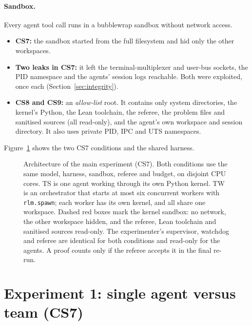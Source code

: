 \documentclass[11pt]{article}
\begin{document}
\paragraph{Sandbox.} Every agent tool call runs in a bubblewrap sandbox without network access.
\begin{itemize}
  \item \textbf{CS7:} the sandbox started from the full filesystem and hid only the other workspaces.
  \item \textbf{Two leaks in CS7:} it left the terminal-multiplexer and user-bus sockets, the PID namespace and the
    agents' session logs reachable. Both were exploited, once each (Section~\ref{sec:integrity}).
  \item \textbf{CS8 and CS9:} an \emph{allow-list} root. It contains only system directories, the kernel's Python, the
    Lean toolchain, the referee, the problem files and sanitised sources (all read-only), and the agent's own workspace
    and session directory. It also uses private PID, IPC and UTS namespaces.
\end{itemize}
Figure~\ref{fig:arch} shows the two CS7 conditions and the shared harness.

\begin{figure}[t]
\centering
\resizebox{\linewidth}{!}{}
\caption{Architecture of the main experiment (CS7). Both conditions use the same model, harness, sandbox, referee and
budget, on disjoint CPU cores. TS is one agent working through its own Python kernel. TW is an orchestrator that
starts at most six concurrent workers with \texttt{rlm.spawn}; each worker has its own kernel, and all share one
workspace. Dashed red boxes mark the kernel sandbox: no network, the other workspace hidden, and the referee, Lean
toolchain and sanitised sources read-only. The experimenter's supervisor, watchdog and referee are identical for both conditions and read-only for
the agents. A proof counts only if the referee accepts it in the final re-run.}
\label{fig:arch}
\end{figure}

\section{Experiment 1: single agent versus team (CS7)}
\label{sec:cs7}
\end{document}
